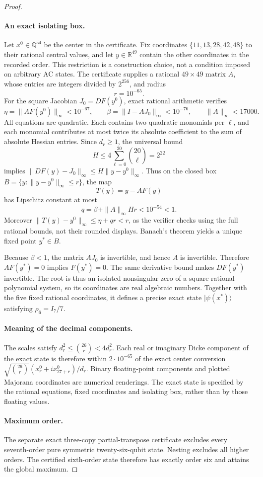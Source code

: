 \documentclass[11pt]{article}
\begin{document}
\begin{proof}
\paragraph{An exact isolating box.}
Let $x^0\in\mathbb Q^{54}$ be the center in the certificate. Fix coordinates
$\{11,13,28,42,48\}$ to their rational central values, and let $y\in\mathbb R^{49}$
contain the other coordinates in the recorded order. This restriction is a
construction choice, not a condition imposed on arbitrary AC states.
The certificate supplies a rational $49\times49$ matrix $A$, whose entries
are integers divided by $2^{256}$, and radius
\[r=10^{-65}.
\]
For the square Jacobian $J_0=DF(y^0)$, exact rational arithmetic verifies
\[
\eta=\|AF(y^0)\|_\infty<10^{-67},\qquad
\beta=\|I-AJ_0\|_\infty<10^{-76},\qquad
\|A\|_\infty<17000.
\]
All equations are quadratic. Each contains two quadratic monomials per
$\ell$, and each monomial contributes at most twice its absolute coefficient
to the sum of absolute Hessian entries. Since $d_r\ge1$, the universal bound
\[
H\le4\sum_{\ell=0}^{20}\binom{20}\ell=2^{22}
\]
implies $\|DF(y)-J_0\|_\infty\le H\|y-y^0\|_\infty$.
Thus on the closed box $B=\{y:\|y-y^0\|_\infty\le r\}$, the map
\[T(y)=y-AF(y)
\]
has Lipschitz constant at most
\[
q=\beta+\|A\|_\infty H r<10^{-54}<1.
\]
Moreover $\|T(y)-y^0\|_\infty\le\eta+qr<r$, as the verifier checks using
the full rational bounds, not their rounded displays. Banach's theorem yields
a unique fixed point $y^*\in B$.

Because $\beta<1$, the matrix $AJ_0$ is invertible, and hence $A$ is invertible.
Therefore $AF(y^*)=0$ implies $F(y^*)=0$. The same derivative bound makes
$DF(y^*)$ invertible. The root is thus an isolated nonsingular zero of a square
rational polynomial system, so its coordinates are real algebraic numbers.
Together with the five fixed rational coordinates, it defines a precise exact
state $|\psi(x^*)\rangle$ satisfying $\rho_6=I_7/7$.

\paragraph{Meaning of the decimal components.}
The scales satisfy $d_r^2\le\binom{26}{r}<4d_r^2$.
Each real or imaginary Dicke component of the exact state is therefore within
$2\cdot10^{-65}$ of the exact center conversion
$\sqrt{\binom{26}{r}}(x_r^0+ix_{27+r}^0)/d_r$.
Binary floating-point components and plotted Majorana coordinates are numerical
renderings. The exact state is specified by the rational equations, fixed
coordinates and isolating box, rather than by those floating values.

\paragraph{Maximum order.}
The separate exact three-copy partial-transpose certificate excludes every
seventh-order pure symmetric twenty-six-qubit state. Nesting excludes all
higher orders. The certified sixth-order state therefore has exactly order six
and attains the global maximum.
\end{proof}
\end{document}
